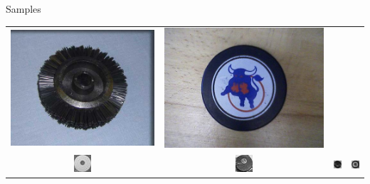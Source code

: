 \documentclass{beamer}
\begin{document}
\begin{frame}{Samples}
\begin{table}[H]
\begin{tabularx}{\textwidth}{@{}cccc@{}}
			\includegraphics[height=\samplesheight]{training_images/hard_negative/n03208556_13484} &
			\includegraphics[height=\samplesheight]{training_images/hard_negative/n04019541_26831} \\
			\includegraphics[height=\samplesheight]{training_images/hard_negative/n03208556_9694.thumbnail.jpg} &
			\includegraphics[height=\samplesheight]{training_images/hard_negative/n03208556_11973.thumbnail.jpg} &
			\includegraphics[height=\samplesheight]{training_images/hard_negative/n03208556_13484.thumbnail.jpg} &
			\includegraphics[height=\samplesheight]{training_images/hard_negative/n04019541_26831.thumbnail.jpg}
		\end{tabularx}
	\end{table}
\end{frame}
\end{document}
